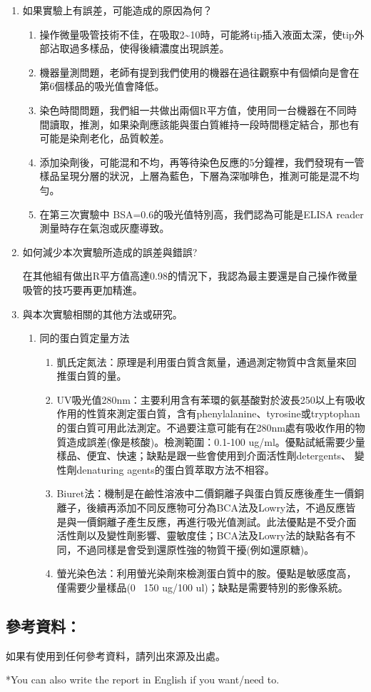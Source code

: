 \begin{enumerate}[label=\arabic*.]
  \item 如果實驗上有誤差，可能造成的原因為何？
  \begin{enumerate}[label=(\arabic*)]
    \item 操作微量吸管技術不佳，在吸取2\~{}10\mul 時，可能將tip插入液面太深，使tip外部沾取過多樣品，使得後續濃度出現誤差。
    \item 機器量測問題，老師有提到我們使用的機器在過往觀察中有個傾向是會在第6個樣品的吸光值會降低。
    \item 染色時間問題，我們組一共做出兩個R平方值，使用同一台機器在不同時間讀取，推測，如果染劑應該能與蛋白質維持一段時間穩定結合，那也有可能是染劑老化，品質較差。
    \item 添加染劑後，可能混和不均，再等待染色反應的5分鐘裡，我們發現有一管樣品呈現分層的狀況，上層為藍色，下層為深咖啡色，推測可能是混不均勻。
    \item 在第三次實驗中 BSA=0.6\mug 的吸光值特別高，我們認為可能是ELISA reader 測量時存在氣泡或灰塵導致。
  \end{enumerate}

  \item 如何減少本次實驗所造成的誤差與錯誤?

  \qquad 在其他組有做出R平方值高達0.98的情況下，我認為最主要還是自己操作微量吸管的技巧要再更加精進。
  \item 與本次實驗相關的其他方法或研究。
  \begin{enumerate}[label=(\arabic*)]
    \item 同的蛋白質定量方法
    \begin{enumerate}[label=\alph*.]
      \item 凱氏定氮法：原理是利用蛋白質含氮量，通過測定物質中含氮量來回推蛋白質的量。
      \item UV吸光值280nm：主要利用含有苯環的氨基酸對於波長250以上有吸收作用的性質來測定蛋白質，含有phenylalanine、tyrosine或tryptophan的蛋白質可用此法測定。不過要注意可能有在280nm處有吸收作用的物質造成誤差(像是核酸)。檢測範圍：0.1-100 ug/ml。優點試紙需要少量樣品、便宜、快速；缺點是跟一些會使用到介面活性劑detergents、 變性劑denaturing agents的蛋白質萃取方法不相容。
      \item Biuret法：機制是在鹼性溶液中二價銅離子與蛋白質反應後產生一價銅離子，後續再添加不同反應物可分為BCA法及Lowry法，不過反應皆是與一價銅離子產生反應，再進行吸光值測試。此法優點是不受介面活性劑以及變性劑影響、靈敏度佳；BCA法及Lowry法的缺點各有不同，不過同樣是會受到還原性強的物質干擾(例如還原糖)。
      \item 螢光染色法：利用螢光染劑來檢測蛋白質中的胺。優點是敏感度高，僅需要少量樣品(0~ 150 ug/100 ul)；缺點是需要特別的影像系統。
    \end{enumerate}
  \end{enumerate}
  
  
  
  
  
\end{enumerate}


\subsection*{參考資料：}
如果有使用到任何參考資料，請列出來源及出處。

*You can also write the report in English if you want/need to.
